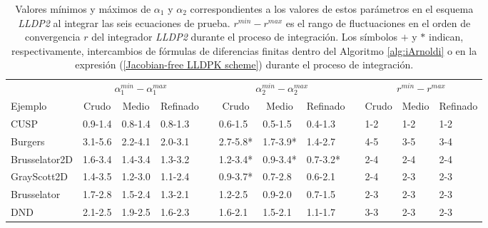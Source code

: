 \begin{table}
	\caption{Valores mínimos y máximos de $\alpha _{1}$ y $\alpha _{2}$ correspondientes a los valores de estos parámetros en el esquema \emph{LLDP2} al integrar las seis ecuaciones de prueba. $r^{min}-r^{max}$ es el rango de fluctuaciones en el orden de convergencia $r$ del integrador \emph{LLDP2} durante el proceso de integración. Los símbolos $+$ y $*$ indican, respectivamente, intercambios de fórmulas de diferencias finitas dentro del Algoritmo \ref{alg:iArnoldi} o en la expresión (\ref{Jacobian-free LLDPK scheme}) durante el proceso de integración.}
	\label{tab:R_LLDP2}
	\begin{adjustbox}{width=0.95\columnwidth,center}
		\begin{tabular}{lccccccccccc}
			& \multicolumn{3}{c}{$\alpha^{min}_{1}-\alpha^{max}_{1}$} &  & \multicolumn{3}{c}{$\alpha^{min}_{2}-\alpha^{max}_{2}$} &  & \multicolumn{3}{c}{$r^{min}-r^{max}$} \\
			\cline{2-4}\cline{6-8}\cline{10-12} Ejemplo & Crudo & Medio & Refinado &  & Crudo & Medio & Refinado &  & Crudo & Medio & Refinado \\
			\hline
			CUSP & \multicolumn{1}{l}{0.9-1.4} & \multicolumn{1}{l}{0.8-1.4} & \multicolumn{1}{l}{0.8-1.3} &  & \multicolumn{1}{l}{0.6-1.5} & \multicolumn{1}{l}{0.5-1.5} & \multicolumn{1}{l}{0.4-1.3} &  & \multicolumn{1}{l}{1-2} & \multicolumn{1}{l}{1-2} & \multicolumn{1}{l}{1-2} \\
			Burgers & \multicolumn{1}{l}{3.1-5.6} & \multicolumn{1}{l}{2.2-4.1} & \multicolumn{1}{l}{2.0-3.1} &  & \multicolumn{1}{l}{2.7-5.8*} & \multicolumn{1}{l}{1.7-3.9*} & \multicolumn{1}{l}{1.4-2.7} &  & \multicolumn{1}{l}{4-5} & \multicolumn{1}{l}{3-5} & \multicolumn{1}{l}{3-4} \\
			Brusselator2D & \multicolumn{1}{l}{1.6-3.4} & \multicolumn{1}{l}{1.4-3.4} & \multicolumn{1}{l}{1.3-3.2} &  & \multicolumn{1}{l}{1.2-3.4*} & \multicolumn{1}{l}{0.9-3.4*} & \multicolumn{1}{l}{0.7-3.2*} &  & \multicolumn{1}{l}{2-4} & \multicolumn{1}{l}{2-4} & \multicolumn{1}{l}{2-4} \\
			GrayScott2D & \multicolumn{1}{l}{1.4-3.5} & \multicolumn{1}{l}{1.2-3.0} & \multicolumn{1}{l}{1.1-2.4} &  & \multicolumn{1}{l}{0.9-3.7*} & \multicolumn{1}{l}{0.7-2.8} & \multicolumn{1}{l}{0.6-2.1} &  & \multicolumn{1}{l}{2-4} & \multicolumn{1}{l}{2-3} & \multicolumn{1}{l}{2-3} \\
			Brusselator & \multicolumn{1}{l}{1.7-2.8} & \multicolumn{1}{l}{1.5-2.4} & \multicolumn{1}{l}{1.3-2.1} &  & \multicolumn{1}{l}{1.2-2.5} & \multicolumn{1}{l}{0.9-2.0} & \multicolumn{1}{l}{0.7-1.5} &  & \multicolumn{1}{l}{2-3} & \multicolumn{1}{l}{2-3} & \multicolumn{1}{l}{2-3} \\
			DND & \multicolumn{1}{l}{2.1-2.5} & \multicolumn{1}{l}{1.9-2.5} & \multicolumn{1}{l}{1.6-2.3} &  & \multicolumn{1}{l}{1.6-2.1} & \multicolumn{1}{l}{1.5-2.1} & \multicolumn{1}{l}{1.1-1.7} &  & \multicolumn{1}{l}{3-3} & \multicolumn{1}{l}{2-3} & \multicolumn{1}{l}{2-3} \\
			\hline
		\end{tabular}
	\end{adjustbox}
\end{table}

